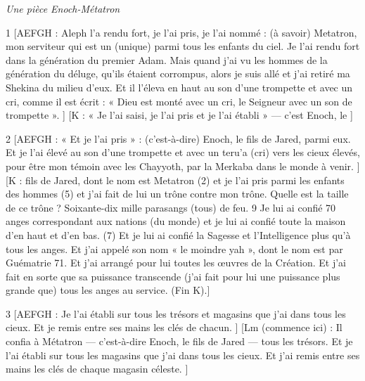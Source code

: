 
\par \textit{Une pièce Enoch-Métatron}

\par 1 [AEFGH : Aleph l'a rendu fort, je l'ai pris, je l'ai nommé : (à savoir) Metatron, mon serviteur qui est un (unique) parmi tous les enfants du ciel. Je l'ai rendu fort dans la génération du premier Adam. Mais quand j'ai vu les hommes de la génération du déluge, qu'ils étaient corrompus, alors je suis allé et j'ai retiré ma Shekina du milieu d'eux. Et il l'éleva en haut au son d'une trompette et avec un cri, comme il est écrit : « Dieu est monté avec un cri, le Seigneur avec un son de trompette ». ] [K : « Je l'ai saisi, je l'ai pris et je l'ai établi » — c'est Enoch, le ]


\par 2 [AEFGH : « Et je l'ai pris » : (c'est-à-dire) Enoch, le fils de Jared, parmi eux. Et je l'ai élevé au son d'une trompette et avec un teru'a (cri) vers les cieux élevés, pour être mon témoin avec les Chayyoth, par la Merkaba dans le monde à venir. ] [K : fils de Jared, dont le nom est Metatron (2) et je l'ai pris parmi les enfants des hommes (5) et j'ai fait de lui un trône contre mon trône. Quelle est la taille de ce trône ? Soixante-dix mille parasangs (tous) de feu. 9 Je lui ai confié 70 anges correspondant aux nations (du monde) et je lui ai confié toute la maison d'en haut et d'en bas. (7) Et je lui ai confié la Sagesse et l'Intelligence plus qu'à tous les anges. Et j'ai appelé son nom « le moindre yah », dont le nom est par Guématrie 71. Et j'ai arrangé pour lui toutes les œuvres de la Création. Et j’ai fait en sorte que sa puissance transcende (j’ai fait pour lui une puissance plus grande que) tous les anges au service. (Fin K).]

\par 3 [AEFGH : Je l'ai établi sur tous les trésors et magasins que j'ai dans tous les cieux. Et je remis entre ses mains les clés de chacun. ] [Lm (commence ici) : Il confia à Métatron — c'est-à-dire Enoch, le fils de Jared — tous les trésors. Et je l'ai établi sur tous les magasins que j'ai dans tous les cieux. Et j'ai remis entre ses mains les clés de chaque magasin céleste. ]

